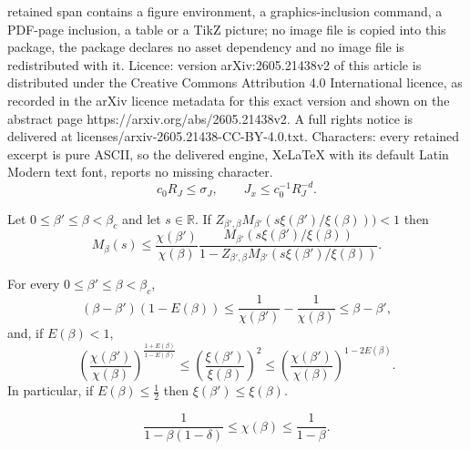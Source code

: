 \documentclass[10pt,a4paper]{amsart}
\begin{document}
retained span contains a figure environment, a graphics-inclusion command, a PDF-page inclusion, a table or a TikZ picture; no image file is copied into this package, the package declares no asset dependency and no image file is redistributed with it. Licence: version arXiv:2605.21438v2 of this article is distributed under the Creative Commons Attribution 4.0 International licence, as recorded in the arXiv licence metadata for this exact version and shown on the abstract page https://arxiv.org/abs/2605.21438v2. A full rights notice is delivered at licenses/arxiv-2605.21438-CC-BY-4.0.txt. Characters: every retained excerpt is pure ASCII, so the delivered engine, XeLaTeX with its default Latin Modern text font, reports no missing character.
\begin{equation}
\label{eq:R_J comparable to xi(0)}
    c_0R_J \le \sigma_J,
    \qquad
    J_{x} \le c_0^{-1}R_J^{-d}.
\end{equation}

\begin{Coro}
\label{coro:Miteration}
Let $0\leq \beta'\leq \beta<\beta_c$ and let $s \in \mathbb R$.
If $Z_{\beta',\beta}M_{\beta'}(s\xi(\beta')/\xi(\beta))) < 1$
then
\begin{equation}
\label{eq:Mfirstbd}
    M_\beta(s)
    \le
    \frac{\chi(\beta')}{\chi(\beta)}
    \frac{M_{\beta'}(s\xi(\beta')/\xi(\beta))}{1-Z_{\beta',\beta}M_{\beta'}(s\xi(\beta')/\xi(\beta))}
    .
\end{equation}
\end{Coro}

\begin{Prop}
\label{prop: rough bounds chi xi}
For every $0\leq \beta'\leq \beta < \beta_c$,
\begin{equation}\label{eq:bounds chi}
	(\beta-\beta')(1-E(\beta))\leq \frac{1}{\chi(\beta')}-\frac{1}{\chi(\beta)}\leq \beta-\beta',
\end{equation}
and, if $E(\beta)<1$,
\begin{equation}\label{eq:bounds chi xi} \left(\frac{\chi(\beta')}{\chi(\beta)}\right)^{\frac{1+E(\beta)}{1-E(\beta)}}
    \leq \left(\frac{\xi(\beta')}{\xi(\beta)}\right)^2
    \leq \left(\frac{\chi(\beta')}{\chi(\beta)}\right)^{ 1-2E(\beta)}.
\end{equation}
In particular, if $E(\beta)\le \frac 12$ then
$\xi(\beta') \le \xi(\beta)$.
\end{Prop}

\begin{equation}\label{eq:chi0}
	\frac{1}{1-\beta(1-\delta)}\leq \chi(\beta)\leq \frac{1}{1-\beta}.
\end{equation}
\end{document}
